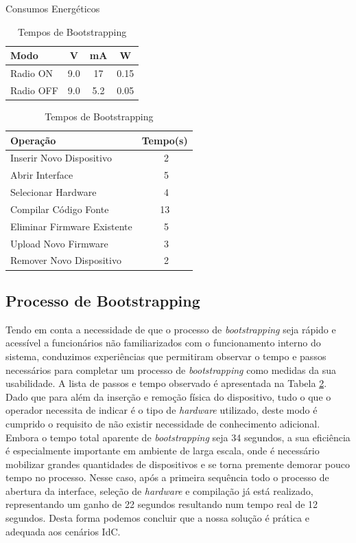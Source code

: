 \documentclass{llncs}
\begin{document}
\begin{table}
\parbox{.45\linewidth}{
\centering
\caption{Consumos Energéticos}
\label{tab:power_consumptions}
\begin{tabular}{|l|c|c|c|} \hline
Modo&V&mA&W\\ \hline
Radio ON& 9.0& 17&0.15\\ \hline
Radio OFF& 9.0& 5.2&0.05\\ 
\hline\end{tabular}
}
\hfill
\parbox{.55\linewidth}{
\centering
\caption{Tempos de Bootstrapping}
\label{tab:bootstrapping_time}
\begin{tabular}{|l|c|} \hline
Operação&Tempo(s)\\ \hline
Inserir Novo Dispositivo&\,\,2\\ \hline
Abrir Interface&\,\,5\\ \hline
Selecionar Hardware&\,\,4\\ \hline
Compilar Código Fonte&13\\ \hline
Eliminar Firmware Existente&\,\,5\\ \hline
Upload Novo Firmware&\,\,3\\ \hline
Remover Novo Dispositivo&\,\,2\\ 
\hline\end{tabular}
}
\end{table}

\subsection{Processo de Bootstrapping}
Tendo em conta a necessidade de que o processo de \textit{bootstrapping} seja rápido e acessível a funcionários não familiarizados com o funcionamento interno do sistema, conduzimos experiências que permitiram observar o tempo e passos necessários para completar um processo de \textit{bootstrapping} como medidas da sua usabilidade. 
A lista de passos e tempo observado é apresentada na Tabela \ref{tab:bootstrapping_time}. 
Dado que para além da inserção e remoção física do dispositivo, tudo o que o operador necessita de indicar é o tipo de \textit{hardware} utilizado, deste modo é cumprido o requisito de não existir necessidade de conhecimento adicional. 
Embora o tempo total aparente de \textit{bootstrapping} seja 34 segundos, a sua eficiência é especialmente importante em ambiente de larga escala, onde é necessário mobilizar grandes quantidades de dispositivos e se torna premente demorar pouco tempo no processo. 
Nesse caso, após a primeira sequência todo o processo de abertura da interface, seleção de \textit{hardware} e compilação já está realizado, representando um ganho de 22 segundos resultando num tempo real de 12 segundos. 
Desta forma podemos concluir que a nossa solução é prática e adequada aos cenários \ac{IdC}.
\end{document}
